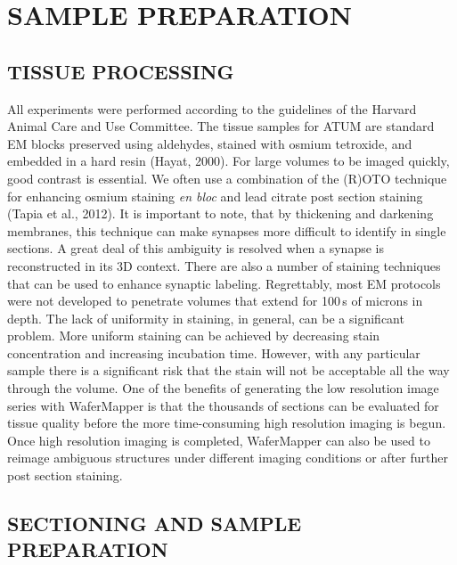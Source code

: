\documentclass{article}
\begin{document}
\section*{SAMPLE PREPARATION}
\subsection*{TISSUE PROCESSING}

All experiments were performed according to the guidelines of the Harvard Animal Care and Use Committee. The tissue samples for ATUM are standard EM blocks preserved using aldehydes, stained with osmium tetroxide, and embedded in a hard resin (Hayat, 2000). For large volumes to be imaged quickly, good contrast is essential. We often use a combination of the (R)OTO technique for enhancing osmium staining \emph{en bloc} and lead citrate post section staining (Tapia et al., 2012). It is important to note, that by thickening and darkening membranes, this technique can make synapses more difficult to identify in single sections. A great deal of this ambiguity is resolved when a synapse is reconstructed in its 3D context. There are also a number of staining techniques that can be used to enhance synaptic labeling. Regrettably, most EM protocols were not developed to penetrate volumes that extend for 100\,s of microns in depth. The lack of uniformity in staining, in general, can be a significant problem. More uniform staining can be achieved by decreasing stain concentration and increasing incubation time. However, with any particular sample there is a significant risk that the stain will not be acceptable all the way through the volume. One of the benefits of generating the low resolution image series with WaferMapper is that the thousands of sections can be evaluated for tissue quality before the more time-consuming high resolution imaging is begun. Once high resolution imaging is completed, WaferMapper can also be used to reimage ambiguous structures under different imaging conditions or after further post section staining.

\subsection*{SECTIONING AND SAMPLE PREPARATION}
\end{document}
